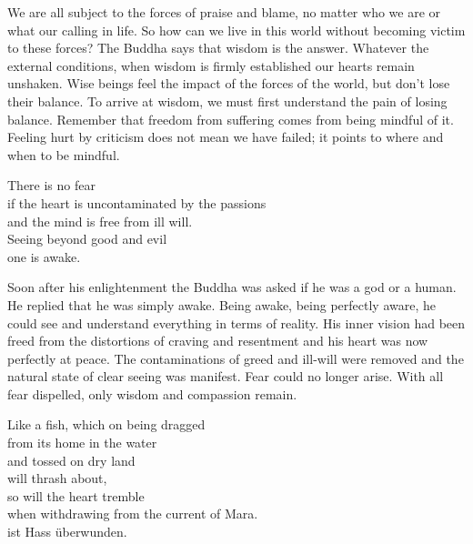 \begin{dhpRefl}
We are all subject to the forces of praise and blame, no matter who we are or what our calling in life. So how can we live in this world without becoming victim to these forces? The Buddha says that wisdom is the answer. Whatever the external conditions, when wisdom is firmly established our hearts remain unshaken. Wise beings feel the impact of the forces of the world, but don't lose their balance. To arrive at wisdom, we must first understand the pain of losing balance. Remember that freedom from suffering comes from being mindful of it. Feeling hurt by criticism does not mean we have failed; it points to where and when to be mindful.
\end{dhpRefl}


\begin{dhpVerse}{39}
\label{dhp-39}
There is no fear\\
if the heart is uncontaminated by the passions\\
and the mind is free from ill will.\\
Seeing beyond good and evil\\
one is awake.
\end{dhpVerse}

\begin{dhpRefl}
Soon after his enlightenment the Buddha was asked if he was a god or a human. He replied that he was simply awake. Being awake, being perfectly aware, he could see and understand everything in terms of reality. His inner vision had been freed from the distortions of craving and resentment and his heart was now perfectly at peace. The contaminations of greed and ill-will were removed and the natural state of clear seeing was manifest. Fear could no longer arise. With all fear dispelled, only wisdom and compassion remain.
\end{dhpRefl}


\begin{dhpVerse}{34}
\label{dhp-34}
Like a fish, which on being dragged \\
from its home in the water \\
and tossed on dry land \\
will thrash about,\\
so will the heart tremble\\
when withdrawing from the current of Mara.\\
ist Hass überwunden.
\end{dhpVerse}


